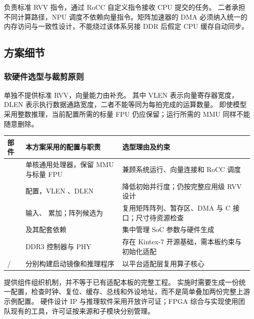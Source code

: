 \VectorUnit{}负责标准 RVV 指令，\AcceleratorName{}通过 RoCC 自定义指令接收 CPU 提交的任务。
二者承担不同计算路径，NPU 调度不依赖向量指令。矩阵加速器的 DMA 必须纳入统一的内存访问与一致性设计，不能绕过该体系另接 DDR 后假定 CPU 缓存自动同步。

\subsection{方案细节}
\subsubsection{软硬件选型与裁剪原则}
\ProcessorCore{}单独不提供标准 RVV，向量能力由\VectorUnit{}补充。
其中 VLEN 表示向量寄存器宽度，DLEN 表示执行数据通路宽度，二者不能等同为每拍完成的运算数量。
即使模型采用整数推理，当前\VectorUnit{}配置所需的标量 FPU 仍应保留；运行\LinuxDistribution{}所需的 MMU 同样不能随意删除。

\par{\small\renewcommand{\arraystretch}{1.2}
\noindent\begin{tabularx}{\linewidth}{@{}P{.20\linewidth}YP{.27\linewidth}@{}}
\toprule
部件 & 本方案采用的配置与职责 & 选型理由及约束\\
\midrule
\ProcessorCore{} & 单核通用处理器，保留 MMU 与标量 FPU & 兼顾系统运行、向量连接和 RoCC 调度\\
\VectorUnit{} & \VectorConfig{} 配置，VLEN \VectorLength{}、DLEN \VectorDataWidth{} & 降低初始并行度；仍按完整应用级 RVV 设计\\
\AcceleratorName{} & \ModelDataType{} 输入、\ModelAccumulatorType{} 累加；阵列候选为\AcceleratorArrayCandidates{} & 复用矩阵阵列、暂存区、DMA 与 C 接口；尺寸待资源检查\\
\IntegrationFramework{} & \IntegrationVersion{} 及其配套依赖 & 集中管理 SoC 参数与硬件生成\\
\MemoryController{} & DDR3 控制器与 PHY & 存在 Kintex-7 开源基础，需本板约束与初始化适配\\
\RealTimeSystem{} / \LinuxDistribution{} & 分别构建启动镜像和推理程序 & 以平台适配层复用算子核心\\
\bottomrule
\end{tabularx}\par}



\IntegrationFramework{}提供组件组织机制，并不等于已有适配本板的完整工程。
实施时需要生成一份统一配置，检查时钟、复位、缓存、总线和外设地址，而不是简单叠加两份完整上游示例配置。
硬件设计 IP 与推理软件采用开放许可证；FPGA 综合与实现使用团队现有的\FPGATool{}工具，许可证按来源和子模块分别管理。

